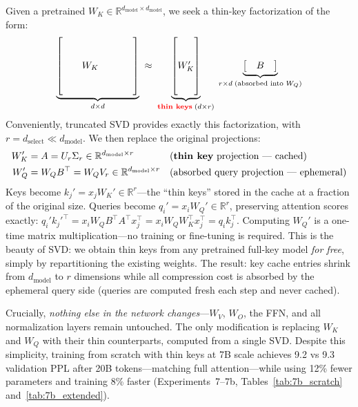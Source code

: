 \documentclass{article} %
\newcommand{\dmodel}{d_{\text{model}}}
\newcommand{\dselect}{d_{\text{select}}}
\begin{document}
Given a pretrained $W_K \in \mathbb{R}^{\dmodel \times \dmodel}$, we seek a thin-key factorization of the form:
\begin{equation}
\underbrace{
\begin{bmatrix} & & & \\ \\ \quad & W_K & \quad \\ \\ & & & \phantom{x} \end{bmatrix}
}_{d \times d}
\;\approx\;
\underbrace{
\begin{bmatrix} \\ \\ W_K' \\ \\ \phantom{x} \end{bmatrix}
}_{\text{\textcolor{red}{\textbf{thin keys}}}\; (d \times r)}
\;
\underbrace{
\begin{bmatrix} & B & \end{bmatrix}
}_{r \times d \;\text{(absorbed into } W_Q\text{)}}
\end{equation}
Conveniently, truncated SVD provides exactly this factorization, with $r = \dselect \ll \dmodel$. We then replace the original projections:
\begin{align}
W_K' &= A = U_r \Sigma_r \in \mathbb{R}^{\dmodel \times r} & &\text{(\textbf{thin key} projection --- cached)} \label{eq:thin_key} \\
W_Q' &= W_Q B^\top = W_Q V_r \in \mathbb{R}^{\dmodel \times r} & &\text{(absorbed query projection --- ephemeral)} \label{eq:absorbed_query}
\end{align}
Keys become $k_j' = x_j W_K' \in \mathbb{R}^r$---the ``thin keys'' stored in the cache at a fraction of the original size. Queries become $q_i' = x_i W_Q' \in \mathbb{R}^r$, preserving attention scores exactly: $q_i' k_j'^\top = x_i W_Q B^\top A^\top x_j^\top = x_i W_Q W_K^\top x_j^\top = q_i k_j^\top$. Computing $W_Q'$ is a one-time matrix multiplication---no training or fine-tuning is required. This is the beauty of SVD: we obtain thin keys from any pretrained full-key model \emph{for free}, simply by repartitioning the existing weights. The result: key cache entries shrink from $\dmodel$ to $r$ dimensions while all compression cost is absorbed by the ephemeral query side (queries are computed fresh each step and never cached).

Crucially, \emph{nothing else in the network changes}---$W_V$, $W_O$, the FFN, and all normalization layers remain untouched. The only modification is replacing $W_K$ and $W_Q$ with their thin counterparts, computed from a single SVD. Despite this simplicity, training from scratch with thin keys at 7B scale achieves 9.2 vs 9.3 validation PPL after 20B tokens---matching full attention---while using 12\% fewer parameters and training 8\% faster (Experiments~7--7b, Tables~\ref{tab:7b_scratch} and~\ref{tab:7b_extended}).
\end{document}
